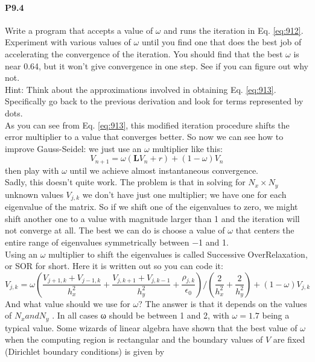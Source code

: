 \paragraph*{P9.4} Write a program that accepts a value of $\omega$ and runs the iteration in Eq. \eqref{eq:912}.
Experiment with various values of $\omega$ until you find one that does the best
job of accelerating the convergence of the iteration. You should find that
the best $\omega$ is near 0.64, but it won’t give convergence in one step. See if you
can figure out why not.\\
Hint: Think about the approximations involved in obtaining Eq. \eqref{eq:913}. Specifically go back to the previous derivation and look for terms represented by dots.\\
As you can see from Eq. \eqref{eq:913}, this modified iteration procedure shifts the
error multiplier to a value that converges better. So now we can see how to
improve Gauss-Seidel: we just use an $\omega$ multiplier like this:
\begin{equation}\label{eq:914}
V_{n+1}=\omega\left(\mathbf{L} V_{n}+r\right)+(1-\omega) V_{n}
\end{equation}
then play with $\omega$ until we achieve almost instantaneous convergence. \\ 
Sadly, this doesn\rq t quite work. The problem is that in solving for $N_x × N_y$
unknown values $V_{j,k}$ we don\rq t have just one multiplier; we have one for each
eigenvalue of the matrix. So if we shift one of the eigenvalues to zero, we might
shift another one to a value with magnitude larger than 1 and the iteration will
not converge at all. The best we can do is choose a value of $\omega$ that centers the
entire range of eigenvalues symmetrically between −1 and 1. \\ 
Using an $\omega$ multiplier to shift the eigenvalues is called Successive OverRelaxation, or SOR for short. Here it is written out so you can code it:
\begin{equation}\label{eq:915}
V_{j, k}=\omega\left(\frac{V_{j+1, k}+V_{j-1, k}}{h_{x}^{2}}+\frac{V_{j, k+1}+V_{j, k-1}}{h_{y}^{2}}+\frac{\rho_{j, k}}{\epsilon_{0}}\right) /\left(\frac{2}{h_{x}^{2}}+\frac{2}{h_{y}^{2}}\right)+(1-\omega) V_{j, k}
\end{equation}
And what value should we use for $\omega$? The answer is that it depends on the values
of $N_x and N_y$ . In all cases ω should be between 1 and 2, with $\omega = 1.7$ being a
typical value. Some wizards of linear algebra have shown that the best value of $\omega$ when the computing region is rectangular and the boundary values of $V$ are fixed (Dirichlet boundary conditions) is given by
